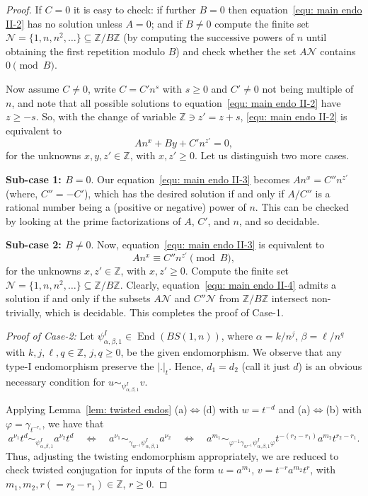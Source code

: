 \documentclass[10pt,a4paper]{amsart}
\newcommand{\End}{\operatorname{End}}
\newcommand\ZZ{\mathbb{Z}}
\begin{document}
\begin{proof}
If $C=0$ it is easy to check: if further $B=0$ then equation~\eqref{equ: main endo II-2} has no solution unless $A=0$; and if $B\neq 0$ compute the finite set $\mathcal{N}=\{1,n,n^2, \ldots \}\subseteq \ZZ/B\ZZ$ (by computing the successive powers of $n$ until obtaining the first repetition modulo $B$) and check whether the set $A\mathcal{N}$ contains $0 \pmod{B}$.

Now assume $C\neq 0$, write $C=C' n^s$ with $s\geq 0$ and $C'\neq 0$ not being multiple of $n$, and note that all possible solutions to equation~\eqref{equ: main endo II-2} have $z \geq -s$. So, with the change of variable $\ZZ \ni z'=z+s$, \eqref{equ: main endo II-2} is equivalent to 
  \begin{equation}\label{equ: main endo II-3}
 An^x +By + C'n^{z'} =0,
  \end{equation}
 for the unknowns $x,y,z'\in \ZZ$, with $x, z'\geq 0$. Let us distinguish two more cases. 

\textbf{Sub-case 1: $B=0$}. Our equation~\eqref{equ: main endo II-3} becomes $An^x=C'' n^{ z'}$ (where, $C'' = - C'$), which has the desired solution if and only if $A/C''$ is a rational number being a (positive or negative) power of $n$. This can be checked by looking at the prime factorizations of $A$, $C'$, and $n$, and so decidable.

\textbf{Sub-case 2: $B\neq 0$}. Now, equation~\eqref{equ: main endo II-3} is equivalent to 
  \begin{equation}\label{equ: main endo II-4}
 An^x \equiv C''n^{ z'} \pmod{B},
 \end{equation}
 for the unknowns $x,z'\in \ZZ$, with $x,z'\geq 0$. Compute the finite set $\mathcal{N}=\{1,n,n^2, \ldots \}\subseteq \ZZ/B\ZZ$. Clearly, equation~\eqref{equ: main endo II-4} admits a solution if and only if the subsets $A\mathcal{N}$ and $C''\mathcal{N}$ from $\ZZ/B\ZZ$ intersect non-trivially, which is  decidable. This completes the proof of Case-1.

\noindent
\textit{Proof of Case-2:} Let $\psi^{I}_{\alpha, \beta, 1} \in \End(BS(1,n))$, where $\alpha = k/n^j$, $\beta= \ell/ n^q$ with $k, j, \ell, q \in \ZZ$, $j, q \geq 0$, be the given endomorphism. We observe that any type-I endomorphism preserve the $|.|_t$. Hence, $d_1=d_2$ (call it just $d$) is an obvious necessary condition for $u \sim_{\psi^{I}_{\alpha, \beta, 1}} v$. 

Applying Lemma~\ref{lem: twisted endos} (a)$\Leftrightarrow$(d) with $w=t^{-d}$ and (a)$\Leftrightarrow$(b) with $\varphi=\gamma_{t^{-r_1}}$, we have that 
 $$
a^{\nu_1}t^d \sim_{\psi^I_{\alpha, \beta, 1}} a^{\nu_2}t^d \quad \Leftrightarrow \quad a^{\nu_1} \sim_{\gamma_{w^{-1}}\psi^I_{\alpha, \beta,1}} a^{\nu_2} \quad \Leftrightarrow \quad a^{m_1} \sim_{\varphi^{-1}\gamma_{w^{-1}}\psi^I_{\alpha, \beta, 1}\varphi} t^{-(r_2-r_1)}a^{m_2}t^{r_2-r_1}.
 $$
Thus, adjusting the twisting endomorphism appropriately, we are reduced to check twisted conjugation for inputs of the form $u=a^{m_1}$, $v=t^{-r}a^{m_2}t^{r}$, with $m_1, m_2, r (=r_2 - r_1)\in \ZZ$, $r\geq 0$.


\end{proof}
\end{document}
